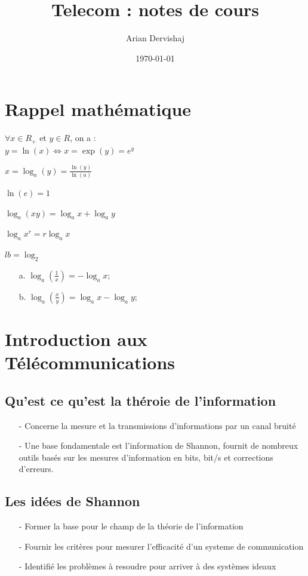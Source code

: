 \documentclass[12pt]{article}
\title{Telecom : notes de cours}
\author{Arian Dervishaj}
\date{\today}
\begin{document}
\maketitle
\pagebreak

\section*{Rappel mathématique}
$\forall x \in R_+$ et $y \in R$, on a : \\
$y = \ln(x) \iff x = \exp(y) = e^{y}$ 

$x=\log_a(y) = \frac{\ln(y)}{\ln(a)}$

$\ln(e) = 1$

$\log_a(xy) = \log_ax + \log_ay$

$\log_a x^{r} = r\log_ax$

$lb = \log_2$

\begin{enumerate}
    \item[a.] $\log_a(\frac{1}{x}) = - \log_ax;$
    \item[b.] $\log_a(\frac{x}{y}) = \log_ax - \log_ay;$
\end{enumerate}

\pagebreak

\section*{Introduction aux Télécommunications}
\subsection*{Qu'est ce qu'est la théroie de l'information}
\begin{itemize}
    \item[-] Concerne la mesure et la transmissions d'informations par un canal bruité
    \item[-] Une base fondamentale est l'information de Shannon, fournit de nombreux outils basés sur les mesures d'information en bits, bit/s et corrections d'erreurs.
\end{itemize}

\subsection*{Les idées de Shannon}
\begin{itemize}
    \item[-] Former la base pour le champ de la théorie de l'information
    \item[-] Fournir les critères pour mesurer l'efficacité d'un systeme de communication
    \item[-] Identifié les problèmes à resoudre pour arriver à des systèmes ideaux 
\end{itemize}
\end{document}
